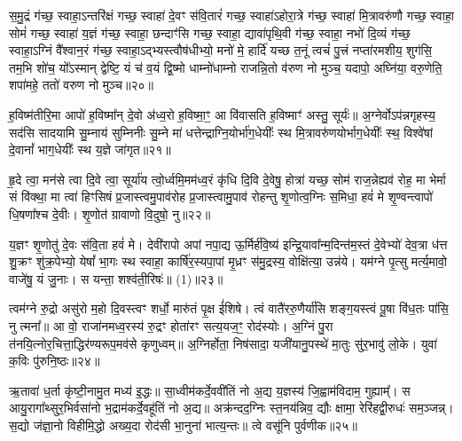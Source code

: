 स॒मु॒द्रं ग॑च्छ॒ स्वाहा॒\-ऽन्तरि॑क्षं गच्छ॒ स्वाहा॑ दे॒वꣳ स॑वि॒तारं॑ गच्छ॒ स्वाहा॑\-ऽहोरा॒त्रे ग॑च्छ॒ स्वाहा॑ मि॒त्रावरु॑णौ गच्छ॒ स्वाहा॒ सोमं॑ गच्छ॒ स्वाहा॑ य॒ज्ञं ग॑च्छ॒ स्वाहा॒ छन्दाꣳ॑सि गच्छ॒ स्वाहा॒ द्यावा॑पृथि॒वी ग॑च्छ॒ स्वाहा॒ नभो॑ दि॒व्यं ग॑च्छ॒ स्वाहा॒\-ऽग्निं वै᳚श्वान॒रं ग॑च्छ॒ स्वाहा॒\-ऽद्भ्यस्त्वौष॑धीभ्यो॒ मनो॑ मे॒ हार्दि॑ यच्छ त॒नूं त्वचं॑ पु॒त्त्रं नप्ता॑रमशीय॒ शुग॑सि॒ तम॒भि शो॑च॒ यो᳚\-ऽस्मान् द्वेष्टि॒ यं च॑ व॒यं द्वि॒ष्मो धाम्नो॑धाम्नो राजन्नि॒तो व॑रुण नो मुञ्च॒ यदापो॒ अघ्नि॑या॒ वरु॒णेति॒ शपा॑महे॒ ततो॑ वरुण नो मुञ्च॥२०॥

{\anuvakamend[{अ॒सि॒ षड्विꣳ॑शतिश्च॥11॥}]}

ह॒विष्म॑तीरि॒मा आपो॑ ह॒विष्मा᳚न् दे॒वो अ॑ध्व॒रो ह॒विष्मा॒ꣳ॒ आ वि॑वासति ह॒विष्माꣳ॑ अस्तु॒ सूर्यः॑॥ अ॒ग्नेर्वो\-ऽप॑न्नगृहस्य॒ सद॑सि सादयामि सु॒म्नाय॑ सुम्निनीः सु॒म्ने मा॑ धत्तेन्द्राग्नि॒योर्भा॑ग॒धेयीः᳚ स्थ मि॒त्रावरु॑णयोर्भाग॒धेयीः᳚ स्थ॒ विश्वे॑षां दे॒वानां᳚ भाग॒धेयीः᳚ स्थ य॒ज्ञे जा॑गृत॥२१॥

{\anuvakamend[{ह॒विष्म॑ती॒श्चतु॑स्रिꣳशत्॥12॥}]}

हृ॒दे त्वा॒ मन॑से त्वा दि॒वे त्वा॒ सूर्या॑य त्वो॒र्ध्वमि॒मम॑ध्व॒रं कृ॑धि दि॒वि दे॒वेषु॒ होत्रा॑ यच्छ॒ सोम॑ राज॒न्नेह्यव॑ रोह॒ मा भेर्मा सं वि॑क्था॒ मा त्वा॑ हिꣳसिषं प्र॒जास्त्वमु॒पाव॑रोह प्र॒जास्त्वामु॒पाव॑ रोहन्तु शृ॒णोत्व॒ग्निः स॒मिधा॒ हवं॑ मे शृ॒ण्वन्त्वापो॑ धि॒षणा᳚श्च दे॒वीः। शृ॒णोत॑ ग्रावाणो वि॒दुषो॒ नु॥२२॥

य॒ज्ञꣳ शृ॒णोतु॑ दे॒वः स॑वि॒ता हवं॑ मे। देवी॑रापो अपां नपा॒द्य ऊ॒र्मिर्\mbox{}ह॑वि॒ष्य॑ इन्द्रि॒यावा᳚न्म॒दिन्त॑म॒स्तं दे॒वेभ्यो॑ देव॒त्रा ध॑त्त शु॒क्रꣳ शु॑क्र॒पेभ्यो॒ येषां᳚ भा॒गः स्थ स्वाहा॒ कार्\mbox{}षि॑र॒स्यपा॒पां मृ॒ध्रꣳ स॑मु॒द्रस्य॒ वोक्षि॑त्या॒ उन्न॑ये। यम॑ग्ने पृ॒त्सु मर्त्य॒मावो॒ वाजे॑षु॒ यं जु॒नाः। स यन्ता॒ शश्व॑ती॒रिषः॑॥ (1)॥२३॥

{\anuvakamend[{नु स॒प्तच॑त्वारिꣳशच्च॥13॥}]}

त्वम॑ग्ने रु॒द्रो असु॑रो म॒हो दि॒वस्त्वꣳ शर्धो॒ मारु॑तं पृ॒क्ष ई॑शिषे। त्वं वातै॑ररु॒णैर्या॑सि शङ्ग॒यस्त्वं पू॒षा वि॑ध॒तः पा॑सि॒ नु त्मना᳚॥ आ वो॒ राजा॑नमध्व॒रस्य॑ रु॒द्रꣳ होता॑रꣳ सत्य॒यज॒ꣳ॒ रोद॑स्योः। अ॒ग्निं पु॒रा त॑नयि॒त्नोर॒चित्ता॒द्धिर॑ण्यरूप॒मव॑से कृणुध्वम्॥ अ॒ग्निर्होता॒ निष॑सादा॒ यजी॑यानु॒पस्थे॑ मा॒तुः सु॑र॒भावु॑ लो॒के। युवा॑ क॒विः पु॑रुनि॒ष्ठः॥२४॥

ऋ॒तावा॑ ध॒र्ता कृ॑ष्टी॒नामु॒त मध्य॑ इ॒द्धः॥ सा॒ध्वीम॑कर्दे॒ववी॑तिं नो अ॒द्य य॒ज्ञस्य॑ जि॒ह्वाम॑विदाम॒ गुह्याम्᳚। स आयु॒रागा᳚थ्सुर॒भिर्वसा॑नो भ॒द्राम॑कर्दे॒वहू॑तिं नो अ॒द्य॥ अक्र॑न्दद॒ग्निः स्त॒नय॑न्निव॒ द्यौः क्षामा॒ रेरि॑हद्वी॒रुधः॑ सम॒ञ्जन्न्। स॒द्यो ज॑ज्ञा॒नो विहीमि॒द्धो अख्य॒दा रोद॑सी भा॒नुना॑ भात्य॒न्तः॥ त्वे वसू॑नि पुर्वणीक॥२५॥

